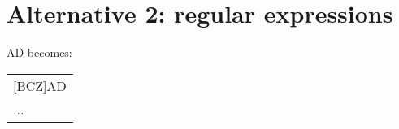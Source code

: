 \documentclass{article}
\begin{document}
\section{Alternative 2: regular expressions}

AD becomes:

\begin{center}
\begin{tabular}{l}
[BCZ]AD \\
... \\
\end{tabular}
\end{center}
\end{document}
